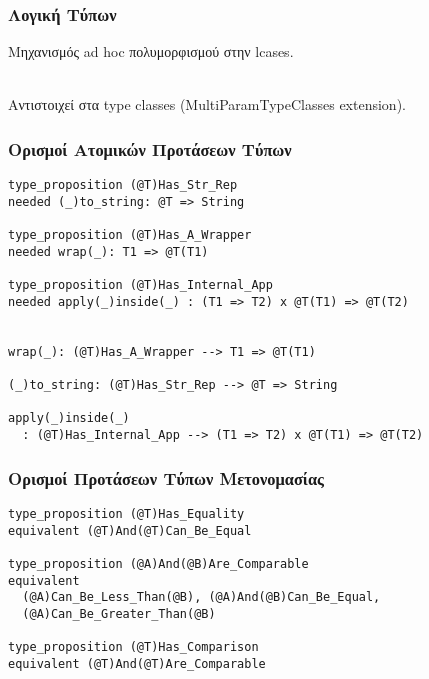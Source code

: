 \documentclass{beamer}
\def\e{\foreignlanguage{english}}
\begin{document}
\begin{frame}

\frametitle{Λογική Τύπων}

Μηχανισμός \e{ad hoc} πολυμορφισμού στην \e{lcases}.
\\~\

Αντιστοιχεί στα \e{type classes (MultiParamTypeClasses extension)}.

\end{frame}

\begin{frame}[fragile]

\frametitle{Ορισμοί Ατομικών Προτάσεων Τύπων}

\begin{otherlanguage}{english}
\begin{verbatim}
type_proposition (@T)Has_Str_Rep
needed (_)to_string: @T => String

type_proposition (@T)Has_A_Wrapper
needed wrap(_): T1 => @T(T1)

type_proposition (@T)Has_Internal_App
needed apply(_)inside(_) : (T1 => T2) x @T(T1) => @T(T2)


wrap(_): (@T)Has_A_Wrapper --> T1 => @T(T1)

(_)to_string: (@T)Has_Str_Rep --> @T => String

apply(_)inside(_)
  : (@T)Has_Internal_App --> (T1 => T2) x @T(T1) => @T(T2)
\end{verbatim}
\end{otherlanguage}

\end{frame}

\begin{frame}[fragile]

\frametitle{Ορισμοί Προτάσεων Τύπων Μετονομασίας}

\begin{otherlanguage}{english}
\begin{verbatim}
type_proposition (@T)Has_Equality
equivalent (@T)And(@T)Can_Be_Equal

type_proposition (@A)And(@B)Are_Comparable
equivalent
  (@A)Can_Be_Less_Than(@B), (@A)And(@B)Can_Be_Equal,
  (@A)Can_Be_Greater_Than(@B)

type_proposition (@T)Has_Comparison
equivalent (@T)And(@T)Are_Comparable
\end{verbatim}
\end{otherlanguage}

\end{frame}
\end{document}
